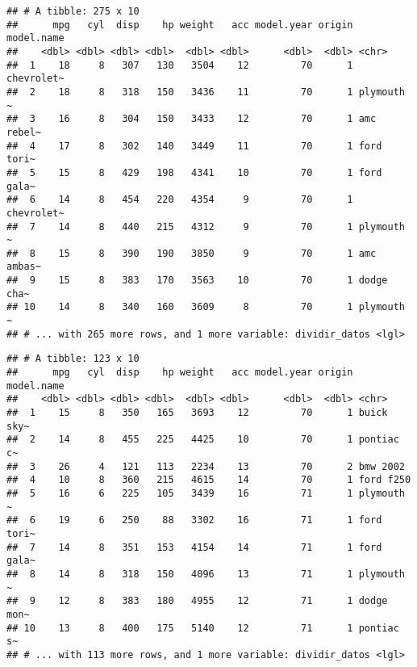 \documentclass[]{article}
\newenvironment{Shaded}{\begin{snugshade}}{\end{snugshade}}
\newcommand{\DecValTok}[1]{\textcolor[rgb]{0.00,0.00,0.81}{#1}}
\newcommand{\KeywordTok}[1]{\textcolor[rgb]{0.13,0.29,0.53}{\textbf{#1}}}
\newcommand{\NormalTok}[1]{#1}
\newcommand{\OperatorTok}[1]{\textcolor[rgb]{0.81,0.36,0.00}{\textbf{#1}}}
\newcommand{\OtherTok}[1]{\textcolor[rgb]{0.56,0.35,0.01}{#1}}
\begin{document}
\begin{Shaded}
\end{Shaded}

\begin{verbatim}
## # A tibble: 275 x 10
##      mpg   cyl  disp    hp weight   acc model.year origin model.name
##    <dbl> <dbl> <dbl> <dbl>  <dbl> <dbl>      <dbl>  <dbl> <chr>     
##  1    18     8   307   130   3504    12         70      1 chevrolet~
##  2    18     8   318   150   3436    11         70      1 plymouth ~
##  3    16     8   304   150   3433    12         70      1 amc rebel~
##  4    17     8   302   140   3449    11         70      1 ford tori~
##  5    15     8   429   198   4341    10         70      1 ford gala~
##  6    14     8   454   220   4354     9         70      1 chevrolet~
##  7    14     8   440   215   4312     9         70      1 plymouth ~
##  8    15     8   390   190   3850     9         70      1 amc ambas~
##  9    15     8   383   170   3563    10         70      1 dodge cha~
## 10    14     8   340   160   3609     8         70      1 plymouth ~
## # ... with 265 more rows, and 1 more variable: dividir_datos <lgl>
\end{verbatim}

\begin{Shaded}
\end{Shaded}

\begin{verbatim}
## # A tibble: 123 x 10
##      mpg   cyl  disp    hp weight   acc model.year origin model.name
##    <dbl> <dbl> <dbl> <dbl>  <dbl> <dbl>      <dbl>  <dbl> <chr>     
##  1    15     8   350   165   3693    12         70      1 buick sky~
##  2    14     8   455   225   4425    10         70      1 pontiac c~
##  3    26     4   121   113   2234    13         70      2 bmw 2002  
##  4    10     8   360   215   4615    14         70      1 ford f250 
##  5    16     6   225   105   3439    16         71      1 plymouth ~
##  6    19     6   250    88   3302    16         71      1 ford tori~
##  7    14     8   351   153   4154    14         71      1 ford gala~
##  8    14     8   318   150   4096    13         71      1 plymouth ~
##  9    12     8   383   180   4955    12         71      1 dodge mon~
## 10    13     8   400   175   5140    12         71      1 pontiac s~
## # ... with 113 more rows, and 1 more variable: dividir_datos <lgl>
\end{verbatim}
\end{document}
